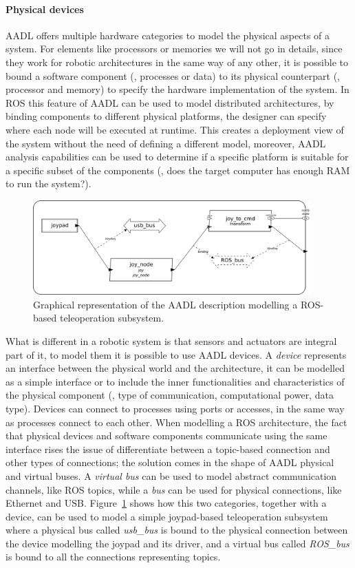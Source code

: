 \paragraph{Physical devices} AADL offers multiple hardware categories to model the physical aspects of a system. For elements like processors or memories we will not go in details, since they work for robotic architectures in the same way of any other, it is possible to bound a software component (\eg, processes or data) to its physical counterpart (\eg, processor and memory) to specify the hardware implementation of the system. In ROS this feature of AADL can be used to model distributed architectures, by binding components to different physical platforms, the designer can specify where each node will be executed at runtime. This creates a deployment view of the system without the need of defining a different model, moreover, AADL analysis capabilities can be used to determine if a specific platform is suitable for a specific subset of the components (\eg, does the target computer has enough RAM to run the system?).

\begin{figure}[t]
    \centering
    \includegraphics[width=0.95\textwidth]{gfx/mini_arch}
    \caption{Graphical representation of the AADL description modelling a ROS-based teleoperation subsystem.}\label{fig:mini-arch}
\end{figure}

What is different in a robotic system is that sensors and actuators are integral part of it, to model them it is possible to use AADL devices. A \textit{device} represents an interface between the physical world and the architecture, it can be modelled as a simple interface or to include the inner functionalities and characteristics of the physical component (\eg, type of communication, computational power, data type).  Devices can connect to processes using ports or accesses, in the same way as processes connect to each other. When modelling a ROS architecture, the fact that physical devices and software components communicate using the same interface rises the issue of differentiate between a topic-based connection and other types of connections; the solution comes in the shape of AADL physical and virtual buses. A \textit{virtual bus} can be used to model abstract communication channels, like ROS topics, while a \textit{bus} can be used for physical connections, like Ethernet and USB. Figure~\ref{fig:mini-arch} shows how this two categories, together with a device, can be used to model a simple joypad-based teleoperation subsystem where a physical bus called \textit{usb\_bus} is bound to the physical connection between the device modelling the joypad and its driver, and a virtual bus called \textit{ROS\_bus} is bound to all the connections representing topics.


